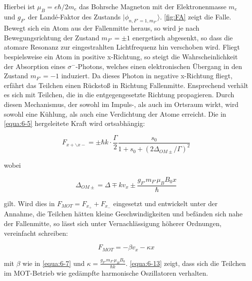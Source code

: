 \documentclass[
class=book,
accentcolor=1b,
custommargins=geometry,
fontsize=11pt,
thesis={type=Versuchsanleitung},
ruledheaders=all,
headline=false,
instbox=false,
marginpar=false,
title=small,
ignore-missing-data=true,
twoside=false,
logofile=apqdesign/tuda_logo.pdf,
pdfa=false %
]{apqpub}
\begin{document}
				Hierbei ist $\mu_B = e \hbar / 2 m_e$ das Bohrsche Magneton mit der Elektronenmasse $m_e$ und $g_{F'}$ der Landé-Faktor des Zustands $\lvert \phi_{n,F'=1,m_{F'}}\rangle$. \autoref{fig:FA} zeigt die Falle. Bewegt sich ein Atom aus der Fallenmitte heraus, so wird je nach Bewegungsrichtung der Zustand $m_{F'} = \pm 1$ energetisch abgesenkt, so dass die atomare Resonanz zur eingestrahlten Lichtfrequenz hin verschoben wird. Fliegt bespielsweise ein Atom in positive x-Richtung, so steigt die Wahrscheinlichkeit der Absorption eines $\sigma^-$-Photons, welches einen elektronischen Übergang in den Zustand $m_{F'} = -1$ induziert. Da dieses Photon in negative x-Richtung fliegt, erfährt das Teilchen einen Rückstoß in Richtung
				Fallenmitte. Ensprechend verhält es sich mit Teilchen, die in die entgegengesetzte Richtung propagieren.
				Durch diesen Mechanismus, der sowohl im Impuls-, als auch im Ortsraum wirkt, wird sowohl eine Kühlung, als
				auch eine Verdichtung der Atome erreicht. Die in \autoref{equa:6-5} hergeleitete Kraft wird ortsabhängig:
				
				\begin{equation}\label{equa:6-11}
				F_{x+\backslash x-} = \pm \hbar k \cdot \frac{\varGamma}{2} \frac{s_0}{1+s_0+(2\varDelta_{OM\pm}/\varGamma)^2} 
				\end{equation}
				
				wobei
				
				\begin{equation}
				\varDelta_{OM\pm} = \varDelta \mp k v_{x} \pm \frac{g_{F'} m_{F'} \mu_B B_0 x}{\hbar}
				\end{equation}
				
				gilt. Wird dies in $F_{MOT} = F_{x_+} + F_{x_-}$ eingesetzt und entwickelt unter der Annahme, die Teilchen hätten kleine Geschwindigkeiten und befänden sich nahe der Fallenmitte, so lässt sich unter Vernachlässigung höherer Ordnungen, vereinfacht schreiben:
				
				\begin{equation}\label{equa:6-13}
				F_{MOT} = -\beta v_x  -\kappa x
				\end{equation}
				
				mit $\beta$ wie in \autoref{equa:6-7} und $\kappa = \frac{g_{F'} m_{F'} \mu_B B_0}{\hbar k}$. \autoref{equa:6-13} zeigt, dass sich die Teilchen im MOT-Betrieb wie gedämpfte harmonische Oszillatoren verhalten.\\
				
\end{document}
